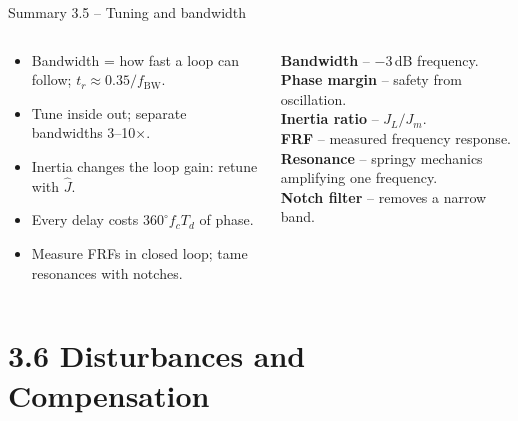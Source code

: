 \documentclass[aspectratio=169,10pt]{beamer}
\begin{document}
\begin{frame}{Summary 3.5 -- Tuning and bandwidth}
\begin{columns}[T,onlytextwidth]
\begin{keybox}
\small
\begin{itemize}
\item Bandwidth = how fast a loop can follow; $t_r\approx0.35/f_\text{BW}$.
\item Tune inside out; separate bandwidths 3--10$\times$.
\item Inertia changes the loop gain: retune with $\hat J$.
\item Every delay costs $360^\circ f_cT_d$ of phase.
\item Measure FRFs in closed loop; tame resonances with notches.
\end{itemize}
\end{keybox}
\begin{defbox}
\small
\textbf{Bandwidth} -- $-3$\,dB frequency.\\
\textbf{Phase margin} -- safety from oscillation.\\
\textbf{Inertia ratio} -- $J_L/J_m$.\\
\textbf{FRF} -- measured frequency response.\\
\textbf{Resonance} -- springy mechanics amplifying one frequency.\\
\textbf{Notch filter} -- removes a narrow band.
\end{defbox}
\end{columns}
\end{frame}

\section{3.6 Disturbances and Compensation}
\end{document}

